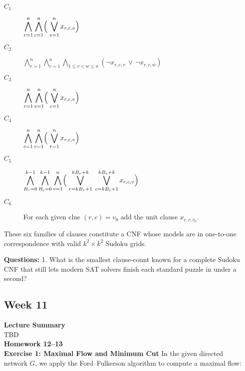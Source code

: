 \documentclass{article}
\theoremstyle{theorem}
\theoremstyle{definition}
\theoremstyle{remark}
\begin{document}
\begin{description}
  \item[$C_1$] $\displaystyle
     \bigwedge_{r=1}^{n}\bigwedge_{c=1}^{n}
       \Bigl(\;\bigvee_{v=1}^{n} x_{r,c,v}\Bigr)$

  \item[$C_2$] $\displaystyle
     \bigwedge_{r=1}^{n}\bigwedge_{c=1}^{n}
       \bigwedge_{1\le v<w\le n}
       (\neg x_{r,c,v}\,\lor\,\neg x_{r,c,w})$

  \item[$C_3$] $\displaystyle
     \bigwedge_{r=1}^{n}\bigwedge_{v=1}^{n}
       \Bigl(\;\bigvee_{c=1}^{n} x_{r,c,v}\Bigr)$

  \item[$C_4$] $\displaystyle
     \bigwedge_{c=1}^{n}\bigwedge_{v=1}^{n}
       \Bigl(\;\bigvee_{r=1}^{n} x_{r,c,v}\Bigr)$

  \item[$C_5$] $\displaystyle
     \bigwedge_{B_r=0}^{k-1}\bigwedge_{B_c=0}^{k-1}\bigwedge_{v=1}^{n}
       \Bigl(\;
         \bigvee_{r=kB_r+1}^{kB_r+k}
         \;\bigvee_{c=kB_c+1}^{kB_c+k}
         x_{r,c,v}\Bigr)$

  \item[$C_6$]  For each given clue $(r,c)=v_{0}$ add the unit clause $x_{r,c,v_{0}}$.
\end{description}

These six families of clauses constitute a CNF whose models are in one-to-one correspondence with valid \(k^{2}\times k^{2}\) Sudoku grids.

\bigskip
\textbf{Questions:} 1. What is the smallest clause-count known for a complete Sudoku CNF that still lets modern SAT solvers finish each standard puzzle in under a second?

\subsection*{\textbf{Week 11}}
\textbf{Lecture Summary}\\
TBD\\

\noindent\textbf{Homework 12--13}\\
\vspace{1em}
\noindent\textbf{Exercise 1: Maximal Flow and Minimum Cut}
In the given directed network $G$, we apply the Ford--Fulkerson algorithm to compute a maximal flow:
\end{document}
